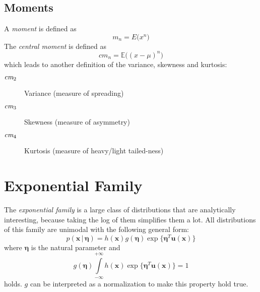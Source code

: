 \documentclass[a4paper, 11pt, accentcolor = tud3b]{tudreport}
\newcommand{\E}{\ensuremath{\mathbb{E}}}
\newcommand{\given}{\ensuremath{\,\vert\,}}
\renewcommand{\vec}[1]{\mathbf{#1}}
\begin{document}
			\subsection{Moments}
				A \emph{moment} is defined as
				\begin{equation}
					m_n = E\big(x^n\big)
				\end{equation}
				The \emph{central moment} is defined as
				\begin{equation}
					\textit{cm}_n = \E\big( (x - \mu)^n \big)
				\end{equation}
				which leads to another definition of the variance, skewness and kurtosis:
				\begin{description}
					\item[\( \textit{\textrm{cm}}_2 \)] Variance (measure of spreading)
					\item[\( \textit{\textrm{cm}}_3 \)] Skewness (measure of asymmetry)
					\item[\( \textit{\textrm{cm}}_4 \)] Kurtosis (measure of heavy/light tailed-ness)
				\end{description}

		\section{Exponential Family}
			The \emph{exponential family} is a large class of distributions that are analytically interesting, because taking the log of them simplifies them a lot. All distributions of this family are unimodal with the following general form:
			\begin{equation}
				p(\vec{x} \given \vec{\eta}) = h(\vec{x}) g(\vec{\eta}) \exp \big\{ \vec{\eta}^T \vec{u}(\vec{x}) \big\}
			\end{equation}
			where \(\vec{\eta}\) is the natural parameter and
			\begin{equation}
				g(\vec{\eta}) \int\limits_{-\infty}^{+\infty} h(\vec{x}) \exp \big\{ \vec{\eta}^T \vec{u}(\vec{x}) \big\} = 1
			\end{equation}
			holds. \(g\) can be interpreted as a normalization to make this property hold true.
\end{document}
